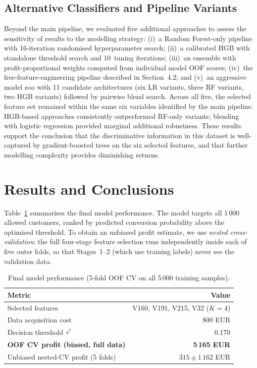 \documentclass[11pt,a4paper]{article}
\begin{document}
\subsection{Alternative Classifiers and Pipeline Variants}

Beyond the main pipeline, we evaluated five additional approaches to assess the sensitivity
of results to the modelling strategy: (i)~a Random Forest-only pipeline with 16-iteration
randomised hyperparameter search; (ii)~a calibrated HGB with standalone threshold search and
10~tuning iterations; (iii)~an ensemble with profit-proportional weights computed from
individual model OOF scores; (iv)~the free-feature-engineering pipeline described in
Section~4.2; and (v)~an aggressive model zoo with 11 candidate architectures (six LR variants,
three RF variants, two HGB variants) followed by pairwise blend search. Across all five, the
selected feature set remained within the same six variables identified by the main pipeline.
HGB-based approaches consistently outperformed RF-only variants; blending with logistic
regression provided marginal additional robustness. These results support the conclusion that
the discriminative information in this dataset is well-captured by gradient-boosted trees on
the six selected features, and that further modelling complexity provides diminishing returns.

\section{Results and Conclusions}

Table~\ref{tab:final} summarises the final model performance.  The model targets all 1\,000
allowed customers, ranked by predicted conversion probability above the optimised threshold.
To obtain an unbiased profit estimate, we use \emph{nested cross-validation}: the full
four-stage feature selection runs independently inside each of five outer folds, so that
Stages~1--2 (which use training labels) never see the validation data.

\begin{table}[H]
\centering
\caption{Final model performance (5-fold OOF CV on all 5\,000 training samples).}
\label{tab:final}
\begin{tabular}{@{}lr@{}}
\toprule
Metric & Value \\
\midrule
Selected features & V160, V191, V215, V32 ($K=4$) \\
Data acquisition cost & 800 EUR \\
Decision threshold $\tau^*$ & 0.170 \\
\midrule
\textbf{OOF CV profit (biased, full data)} & \textbf{5\,165 EUR} \\
Unbiased nested-CV profit (5 folds) & $315 \pm 1\,162$ EUR \\
\bottomrule
\end{tabular}
\end{table}
\end{document}
